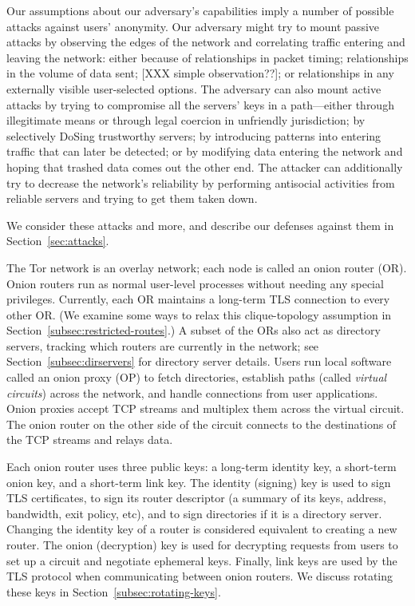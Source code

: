 \documentclass[times,10pt,twocolumn]{article}
\begin{document}
Our assumptions about our adversary's capabilities imply a number of
possible attacks against users' anonymity.  Our adversary might try to
mount passive attacks by observing the edges of the network and
correlating traffic entering and leaving the network: either because
of relationships in packet timing; relationships in the volume of data
sent; [XXX simple observation??]; or relationships in any externally
visible user-selected options.  The adversary can also mount active
attacks by trying to compromise all the servers' keys in a
path---either through illegitimate means or through legal coercion in
unfriendly jurisdiction; by selectively DoSing trustworthy servers; by
introducing patterns into entering traffic that can later be detected;
or by modifying data entering the network and hoping that trashed data
comes out the other end.  The attacker can additionally try to
decrease the network's reliability by performing antisocial activities
from reliable servers and trying to get them taken down.

We consider these attacks and more, and describe our defenses against them
in Section~\ref{sec:attacks}.



\label{sec:design}

The Tor network is an overlay network; each node is called an onion router
(OR). Onion routers run as normal user-level processes without needing
any special
privileges.  Currently, each OR maintains a long-term TLS \cite{TLS}
connection to every other
OR.  (We examine some ways to relax this clique-topology assumption in
Section~\ref{subsec:restricted-routes}.) A subset of the ORs also act as
directory servers, tracking which routers are currently in the network;
see Section~\ref{subsec:dirservers} for directory server details. Users
run local software called an onion proxy (OP) to fetch directories,
establish paths (called \emph{virtual circuits}) across the network,
and handle connections from user applications. Onion proxies accept
TCP streams and multiplex them across the virtual circuit. The onion
router on the other side 
of the circuit connects to the destinations of
the TCP streams and relays data.

Each onion router uses three public keys: a long-term identity key, a
short-term onion key, and a short-term link key.  The identity
(signing) key is used to sign TLS certificates, to sign its router
descriptor (a summary of its keys, address, bandwidth, exit policy,
etc), and to sign directories if it is a directory server. Changing
the identity key of a router is considered equivalent to creating a
new router. The onion (decryption) key is used for decrypting requests
from users to set up a circuit and negotiate ephemeral keys. Finally,
link keys are used by the TLS protocol when communicating between
onion routers.  We discuss rotating these keys in
Section~\ref{subsec:rotating-keys}.
\end{document}
